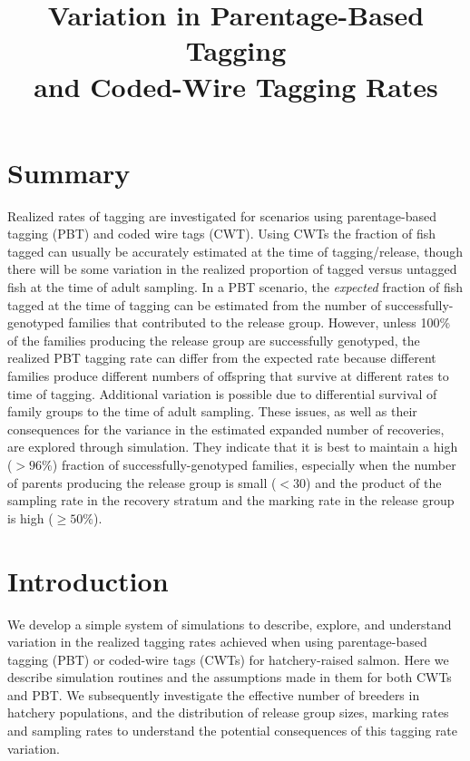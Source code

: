 \documentclass[11pt]{article}
\title{Variation in Parentage-Based Tagging \\
and Coded-Wire  Tagging  Rates}
\date{}
\begin{document}
\maketitle




\section{Summary}
Realized rates of tagging are investigated for scenarios using parentage-based tagging (PBT)
and coded wire tags (CWT).  
Using CWTs the fraction of fish tagged can usually be accurately
estimated at the time of tagging/release, though there will be some variation in the realized
proportion of tagged versus untagged fish at the time of adult sampling.  In a PBT
scenario, the {\em expected} fraction of fish tagged at the time of tagging can be
estimated from the number of successfully-genotyped families that
contributed to the release group.  However, unless 100\% of the families producing the release
group are successfully genotyped, the realized PBT tagging rate can differ from the
expected rate because different families produce different numbers of offspring that survive
at different rates to time of tagging.  Additional variation is possible due to differential
survival of family groups to the time of adult sampling.  These issues, as well as their
consequences for the variance in the estimated expanded number of recoveries, are explored
through simulation.  They indicate that it is best to maintain a high ($>96\%$) fraction
of successfully-genotyped families, especially when the number of parents producing the release
group is small ($<30$) and the product of the sampling rate in the recovery stratum
and the marking rate in the release group is high ($\geq 50\%$).


\section{Introduction}
We develop a simple system of simulations to describe, explore, and understand
variation in the realized tagging rates achieved when using parentage-based tagging (PBT)
or coded-wire tags (CWTs) for hatchery-raised salmon.  Here we describe simulation routines
and the assumptions made in them for both CWTs and PBT.  We subsequently investigate the effective
number of breeders in hatchery populations, and the distribution
of release group sizes, marking rates and sampling rates to understand the potential
consequences of this tagging rate variation.
\end{document}
